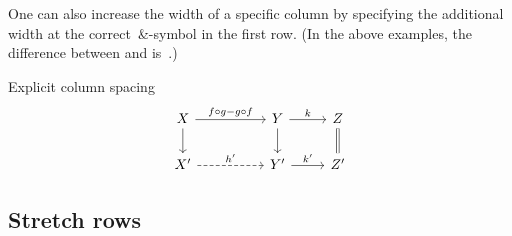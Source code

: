 One can also increase the width of a specific column by specifying the additional width at the correct~\&\nbd-symbol in the first row.
(In the above examples, the difference between  and  is~\optname{2.4em}.)
\begin{showlatex}{Explicit column spacing}
\[
\begin{tikzcd}
  X \arrow{r}{f \circ g - g \circ f} \arrow{d}
  &[2.4em]
  Y \arrow{r}{k} \arrow{d}
  &
  Z \arrow[equal]{d}
  \\
  X' \arrow[dashed]{r}{h'}
  &
  Y' \arrow{r}{k'}
  &
  Z'
\end{tikzcd}
\]
\end{showlatex}



\subsection{Stretch rows}

